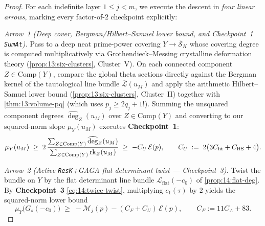 
\begin{proof}
For each indefinite layer $1 \le j < m$, we execute the descent in \emph{four linear arrows}, marking every factor-of-$2$ checkpoint explicitly:

\medskip\noindent
\emph{Arrow~1 (Deep cover, Bergman/Hilbert--Samuel lower bound, and Checkpoint~1 \texttt{SumAt}).}
Pass to a deep neat prime-power covering $Y \to \overline{\mathcal{S}}_K$ whose covering degree is computed multiplicatively via Grothendieck--Messing crystalline deformation theory (\cref{prop:13:six-clusters}, Cluster~V). On each connected component $Z \in \mathrm{Comp}(Y)$, compare the global theta sections directly against the Bergman kernel of the tautological line bundle $\overline{\mathcal{L}}(u_M)$ and apply the arithmetic Hilbert--Samuel lower bound (\cref{prop:13:six-clusters}, Cluster~II) together with \cref{thm:13:volume-pq} (which uses $p_j \ge 2q_j + 1$!). Summing the unsquared component degrees $\widehat{\deg}_Z(u_M)$ over $Z \in \mathrm{Comp}(Y)$ and converting to our squared-norm slope $\mu_Y(u_M)$ executes \textbf{Checkpoint~1}:
\[
  \mu_Y(u_M) \;\ge\; 2\,\frac{\sum_{Z \in \mathrm{Comp}(Y)} \widehat{\deg}_Z(u_M)}{\sum_{Z \in \mathrm{Comp}(Y)} \operatorname{rk}_Z(u_M)}
  \;\ge\; -C_U\,\mathcal{E}(p),
  \qquad C_U \;:=\; 2\bigl(3 C_{\mathrm{ht}} + C_{\mathrm{HS}} + 4\bigr).
\]

\medskip\noindent
\emph{Arrow~2 (Active \texttt{ResK}+GAGA flat determinant twist — Checkpoint~3).}
Twist the bundle on $Y$ by the flat determinant line bundle $\mathcal{L}_{\mathrm{flat}}(-c_0)$ of \cref{prop:14:flat-deg}. By \textbf{Checkpoint~3} \eqref{eq:14:twice-twist}, multiplying $c_1(\tau)$ by $2$ yields the squared-norm lower bound
\[
  \mu_Y\bigl(G_s(-c_0)\bigr) \;\ge\; -\mathcal{M}_j(p) - (C_F + C_U)\,\mathcal{E}(p),
  \qquad C_F := 11 C_A + 83.
\]


\end{proof}
